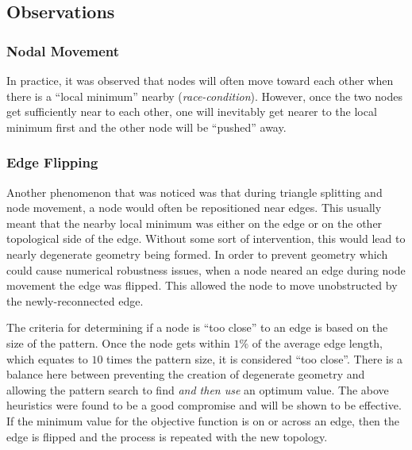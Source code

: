 \subsection{Observations}
\subsubsection{Nodal Movement}
In practice, it was observed that nodes will often move toward each other
when there is a ``local minimum'' nearby ({\it race-condition}).
However, once the two nodes get sufficiently near to each other, one will
inevitably get nearer to the local minimum first and the other node will
be ``pushed'' away.

\subsubsection{Edge Flipping}
Another phenomenon that was noticed was that during triangle splitting
and node movement, a node would often be repositioned near edges. This
usually meant that the nearby local minimum was either on the edge or on 
the other topological side of the edge. Without some sort of intervention,
this would lead to nearly degenerate geometry being formed. In order to
prevent geometry which could cause numerical robustness issues, when a
node neared an edge during node movement the edge was flipped. This
allowed the node to move unobstructed by the newly-reconnected edge.

The criteria for determining if a node is ``too close'' to an edge is
based on the size of the pattern. Once the node gets within $1\%$ of the
average edge length, which equates to $10$ times the pattern size, it is
considered ``too close''. There is a balance here between preventing the
creation of degenerate geometry and allowing the pattern search to find
{\it and then use} an optimum value. The above heuristics were found to
be a good compromise and will be shown to be effective. If the minimum
value for the objective function is on or across an edge, then the edge
is flipped and the process is repeated with the new topology.
